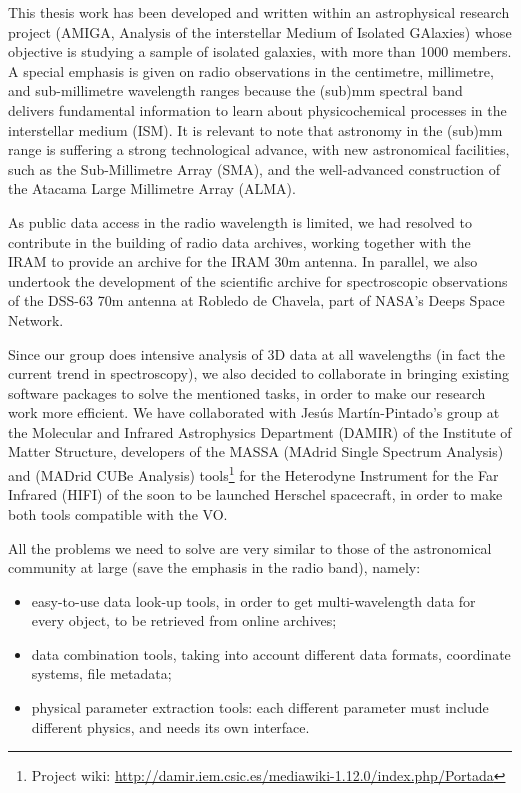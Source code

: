 	This thesis work has been developed and written
	 within an
	astrophysical research project
	(AMIGA, Analysis of the
	interstellar Medium of Isolated GAlaxies) whose objective is
	studying a sample of isolated galaxies, with more than 1000
	members. A special emphasis is given on radio observations in
	the centimetre, millimetre, and sub-millimetre wavelength ranges
	because the (sub)mm spectral band delivers fundamental
	information to learn about physicochemical processes in the
	interstellar medium (ISM). It is relevant to note that astronomy
	in the (sub)mm range is suffering a strong technological
	advance, with new astronomical facilities, such as the
	Sub-Millimetre Array (SMA),
	and the well-advanced construction of the Atacama Large
	Millimetre Array (ALMA).
	
	 As public data access in the radio wavelength is limited, we
	had resolved to contribute in the building of radio data
	archives, working together with the IRAM to provide an archive
	for the IRAM 30m antenna. In parallel, we also undertook the
	development of the scientific archive for spectroscopic
	observations of the DSS-63 70m antenna at Robledo de Chavela,
	part of NASA's Deeps Space Network.
	
	\newcommand{\massaurl}[0]
	{http://damir.iem.csic.es/mediawiki-1.12.0/index.php/Portada}
	 Since our group does intensive analysis of 3D data at all
	wavelengths (in fact the current trend in spectroscopy), we
	also decided to collaborate in bringing existing software
	packages to solve the mentioned tasks, in order to make our
	research work more efficient. We have collaborated with Jesús
	Martín-Pintado's group at the Molecular and Infrared
	Astrophysics Department (DAMIR) of the Institute of Matter
	Structure, developers of the MASSA (MAdrid Single Spectrum
	Analysis) and \madcuba{} (MADrid CUBe Analysis)
	tools\footnote{Project wiki: \url{\massaurl}} for the Heterodyne
	Instrument for the Far
	Infrared (HIFI)
	of the soon to be launched Herschel
	spacecraft, in order to
	make both tools compatible with the VO.
	
	 All the problems we need to solve are very similar to those of
	the astronomical community at large (save the emphasis in the
	radio band), namely:

	\begin{itemize}
		\item easy-to-use data look-up tools, in order to get
		multi-wavelength data for every object, to be retrieved from
		online archives;
		
		\item data combination tools, taking into account different
		data formats, coordinate systems, file metadata;
		
		\item physical parameter extraction tools: each different
		parameter must include different physics, and needs its own
		interface.
	\end{itemize}

